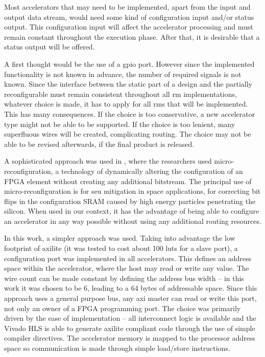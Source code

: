 Most accelerators that may need to be implemented, apart from the input
and output data stream, would need some kind of configuration input and/or
status output. This configuration input will affect the accelerator processing
and must remain constant throughout the execution phase. After that,
it is desirable that a status output will be offered.

A first thought would be the use of a \gls{gpio} port. However since the
implemented functionality is not known in advance, the number of required
signals is not known. Since the interface between the static part of a design
and the partially reconfigurable must remain consistent throughout all \gls{rm} implementations, 
whatever choice is made, it has to apply for all \glspl{rm} that will be implemented.
This has many consequences. If the choice is too conservative, a new accelerator type
might not be able to be supported. If the choice is too lenient, many superfluous
wires will be created, complicating routing. The choice may not be able to be revised afterwards,
if the final product is released.

A sophisticated approach was used in \cite{charitopoulos}, where the researchers used
micro-reconfiguration, a technology of dynamically altering the configuration of an
FPGA element without creating any additional bitstream. 
The principal use of micro-reconfiguration is for \gls{seu} mitigation in space applications,
for correcting bit flips in the configuration SRAM caused by high energy particles
penetrating the silicon.
When used in our context, it has the advantage of being able to configure an
accelerator in any way possible without using any additional routing resources.

In this work, a simpler approach was used. Taking into advantage the low footprint of
\gls{axilite} (it was tested to cost about 100 \glspl{lut} for a slave port),
a configuration port was implemented in all accelerators. This defines
an address space within the accelerator, where the host may read or write any value.
The wire count can be made constant by defining the address bus width -- in this work
it was chosen to be 6, leading to a 64 bytes of addressable space. Since this approach
uses a general purpose bus, any \gls{axi} master can read or write this port,
not only an owner of a FPGA programming port. The choice was primarily driven by
the ease of implementation -- all interconnect logic is available and the Vivado HLS
is able to generate \gls{axilite} compliant code through the use of simple compiler
directives. The accelerator memory is mapped to the processor address space
so communication is made through simple load/store instructions.

